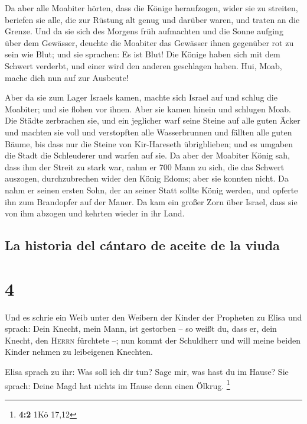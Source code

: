  Da aber alle Moabiter hörten, dass die Könige
heraufzogen, wider sie zu streiten, beriefen sie alle, die zur Rüstung
alt genug und darüber waren, und traten an die Grenze. 
Und da sie sich des Morgens früh aufmachten und die Sonne aufging über
dem Gewässer, deuchte die Moabiter das Gewässer ihnen gegenüber rot zu
sein wie Blut;  und sie sprachen: Es ist Blut! Die Könige
haben sich mit dem Schwert verderbt, und einer wird den anderen
geschlagen haben. Hui, Moab, mache dich nun auf zur Ausbeute!

 Aber da sie zum Lager Israels kamen, machte sich Israel
auf und schlug die Moabiter; und sie flohen vor ihnen. Aber sie kamen
hinein und schlugen Moab.  Die Städte zerbrachen sie, und
ein jeglicher warf seine Steine auf alle guten Äcker und machten sie
voll und verstopften alle Wasserbrunnen und fällten alle guten Bäume,
bis dass nur die Steine von Kir-Hareseth übrigblieben; und es umgaben
die Stadt die Schleuderer und warfen auf sie.  Da aber
der Moabiter König sah, dass ihm der Streit zu stark war, nahm er 700
Mann zu sich, die das Schwert auszogen, durchzubrechen wider den König
Edoms; aber sie konnten nicht.  Da nahm er seinen ersten
Sohn, der an seiner Statt sollte König werden, und opferte ihn zum
Brandopfer auf der Mauer. Da kam ein großer Zorn über Israel, dass sie
von ihm abzogen und kehrten wieder in ihr Land.

\hypertarget{la-historia-del-cuxe1ntaro-de-aceite-de-la-viuda}{%
\subsection{La historia del cántaro de aceite de la
viuda}\label{la-historia-del-cuxe1ntaro-de-aceite-de-la-viuda}}

\hypertarget{section-3}{%
\section{4}\label{section-3}}

 Und es schrie ein Weib unter den Weibern der Kinder der
Propheten zu Elisa und sprach: Dein Knecht, mein Mann, ist gestorben --
so weißt du, dass er, dein Knecht, den \textsc{Herrn} fürchtete --; nun
kommt der Schuldherr und will meine beiden Kinder nehmen zu leibeigenen
Knechten.

 Elisa sprach zu ihr: Was soll ich dir tun? Sage mir, was
hast du im Hause? Sie sprach: Deine Magd hat nichts im Hause denn einen
Ölkrug. \footnote{\textbf{4:2} 1Kö 17,12}

